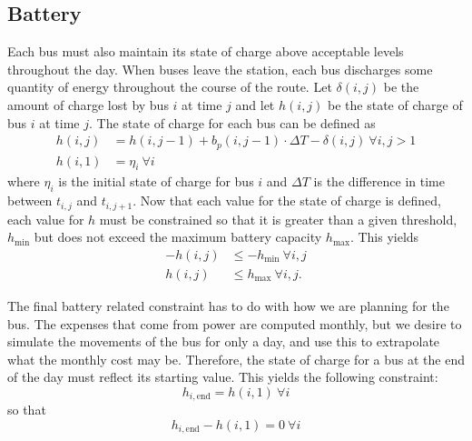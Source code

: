 \subsection{Battery}
\par Each bus must also maintain its state of charge above acceptable levels throughout the day.  When buses leave the station, each bus discharges some quantity of energy throughout the course of the route. Let $\delta(i,j)$ be the amount of charge lost by bus $i$ at time $j$ and let $h(i,j)$ be the state of charge of bus $i$ at time $j$. The state of charge for each bus can be defined as
\begin{equation}\begin{aligned}
	h(i,j) &= h(i,j-1) + b_p(i,j - 1)\cdot \Delta T - \delta(i,j) \ \forall i,j>1 \\
	h(i,1) &= \eta_i \ \forall i
\end{aligned}\end{equation}
where $\eta_i$ is the initial state of charge for bus $i$ and $\Delta T$ is the difference in time between $t_{i,j}$ and $t_{i,j+1}$.
Now that each value for the state of charge is defined, each value for $h$ must be constrained so that it is greater than a given threshold, $h_{\text{min}}$ but does not exceed the maximum battery capacity $h_{\text{max}}$. This yields
\begin{equation} \label{eqn:battery:soc}\begin{aligned}
	-h(i,j) &\le -h_{\text{min}}\ \forall i,j \\
	h(i,j) &\le h_{\text{max}} \ \forall i,j. 
\end{aligned}\end{equation}
\par The final battery related constraint has to do with how we are planning for the bus.  The expenses that come from power are computed monthly, but we desire to simulate the movements of the bus for only a day, and use this to extrapolate what the monthly cost may be.  Therefore, the state of charge for a bus at the end of the day must reflect its starting value.  This yields the following constraint:
\begin{equation*}
	h_{i,\text{end}} = h(i,1) \ \forall i
\end{equation*}
so that
\begin{equation}
	h_{i,\text{end}} - h(i,1)  = 0 \ \forall i
\end{equation}


